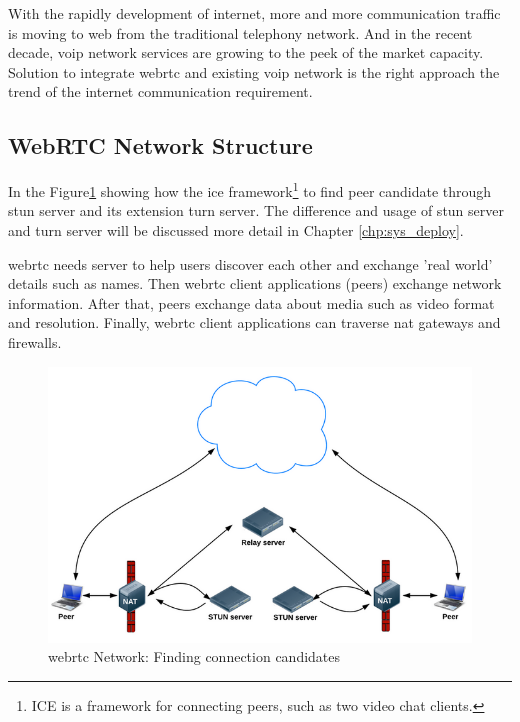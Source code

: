 \par With the rapidly development of internet, more and more communication traffic is moving to web from the traditional telephony network. And in the recent decade, \gls{voip} network services are growing to the peek of the market capacity. Solution to integrate \gls{webrtc} and existing \gls{voip} network is the right approach the trend of the internet communication requirement.

\subsection{WebRTC Network Structure}
\noindent In the Figure\ref{fig:webrtc_network_finCandidate}\cite{html5rock:webrtc} showing how the \gls{ice} framework\footnote{ICE is a framework for connecting peers, such as two video chat clients.\cite{wiki:ice}} to find peer candidate through \gls{stun} server and its extension \gls{turn} server. The difference and usage of \gls{stun} server and \gls{turn} server will be discussed more detail in Chapter \ref{chp:sys_deploy}.
\par \gls{webrtc} needs server to help users discover each other and exchange 'real world' details such as names. Then \gls{webrtc} client applications (peers) exchange network information. After that, peers exchange data about media such as video format and resolution. Finally, \gls{webrtc} client applications can traverse \gls{nat} gateways and firewalls.

\begin{figure}
	\centering
    	\includegraphics[height=0.30\textheight,natwidth=610,natheight=642]{figs/webrtc_network_finCandidate.png}
  	\caption{\gls{webrtc} Network: Finding connection candidates}
  	\label{fig:webrtc_network_finCandidate}
\end{figure} 


